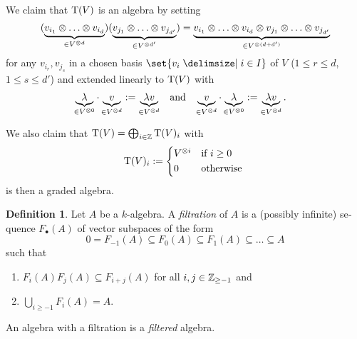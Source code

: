 \documentclass[12pt,a4paper]{scrartcl}
\theoremstyle{cplain}
\theoremstyle{cplain}
\theoremstyle{cplain}
\theoremstyle{definition}
\newtheorem*{deff}{Definition}
\begin{document}
\begin{otherlanguage}{english}
\begin{enumerate}
  We claim that $\operatorname{T}(V)$ is an algebra by setting \[ (\underbrace{v_{i_1} \otimes \ldots \otimes v_{i_d}}_{\in V^{\otimes d}})(\underbrace{v_{j_1} \otimes \ldots \otimes v_{j_{d'}}}_{\in V^{\otimes d'}}) = \underbrace{v_{i_1} \otimes \ldots \otimes v_{i_d} \otimes v_{j_1} \otimes \ldots \otimes v_{j_{d'}}}_{\in V^{\otimes (d+d')}} \] for any $v_{i_r}, v_{j_s}$ in a chosen basis $\set{v_i \given i \in I}$ of $V$ ($1 \le r \le d$, $1 \le s \le d'$) and extended linearly to $\operatorname{T}(V)$ with \begin{align*} \underbrace{\lambda}_{\in V^{\otimes 0}} \cdot \underbrace{v}_{\in V^{\otimes d}} & := \underbrace{\lambda v}_{\in V^{\otimes d}} &&\text{and} & \underbrace{v}_{\in V^{\otimes d}} \cdot \underbrace{\lambda}_{\in V^{\otimes 0}} & := \underbrace{\lambda v}_{\in V^{\otimes d}} . \end{align*}
  
  We also claim that $\operatorname{T}(V) = \bigoplus_{i \in \mathbb Z} \operatorname{T}(V)_i$ with \[ \T(V)_i := \begin{cases*}
                                                                                 V^{\tp i} & if $i \ge 0$ \\
                                                                                 0 & otherwise
                                                                               \end{cases*} \]
  is then a graded algebra.
\end{enumerate}

\begin{deff}
  Let $A$ be a $k$-algebra. A \emph{filtration} of $A$ is a (possibly infinite) sequence $F_\bullet(A)$ of vector subspaces of the form \[ 0 = F_{-1}(A) \subseteq F_0(A) \subseteq F_1(A) \subseteq \ldots \subseteq A \] such that
  \begin{enumerate}
    \item\label{def:filtered algebra:1} $F_i(A)F_j(A) \subseteq F_{i+j}(A)$ for all $i,j \in \mathbb Z_{\ge -1}$ and
    \item\label{def:filtered algebra:2} $\displaystyle \bigcup_{i \ge -1} F_i(A) = A$.
  \end{enumerate}
  An algebra with a filtration is a \emph{filtered} algebra.
\end{deff}


\end{otherlanguage}
\end{document}
